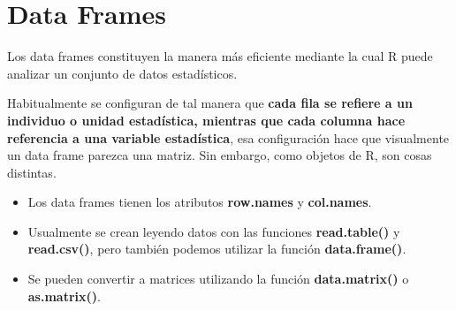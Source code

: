 \documentclass[
  12pt,
]{book}
\begin{document}
\hypertarget{data-frames}{%
\section{\texorpdfstring{\textbf{Data Frames}}{Data Frames}}\label{data-frames}}

Los data frames constituyen la manera más eficiente mediante la cual R puede analizar un conjunto de datos estadísticos.

Habitualmente se configuran de tal manera que \textbf{cada fila se refiere a un individuo o unidad estadística, mientras que cada columna hace referencia a una variable estadística}, esa configuración hace que visualmente un data frame parezca una matriz. Sin embargo, como objetos de R, son cosas distintas.

\begin{itemize}
\item
  Los data frames tienen los atributos \textbf{row.names} y \textbf{col.names}.
\item
  Usualmente se crean leyendo datos con las funciones \textbf{read.table()} y \textbf{read.csv()}, pero también podemos utilizar la función \textbf{data.frame()}.
\item
  Se pueden convertir a matrices utilizando la función \textbf{data.matrix()} o \textbf{as.matrix()}.
\end{itemize}
\end{document}
